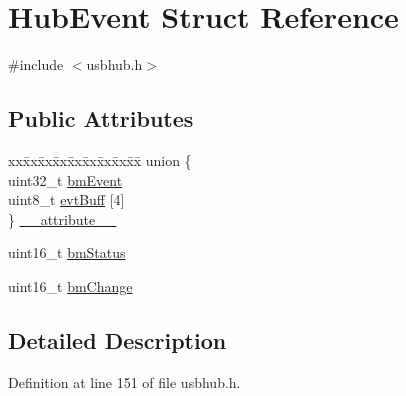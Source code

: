 \hypertarget{struct_hub_event}{\section{\-Hub\-Event \-Struct \-Reference}
\label{struct_hub_event}
}


{\ttfamily \#include $<$usbhub.\-h$>$}

\subsection*{\-Public \-Attributes}
\begin{DoxyCompactItemize}
\item 
\begin{tabbing}
xx\=xx\=xx\=xx\=xx\=xx\=xx\=xx\=xx\=\kill
union \{\\
\>uint32\_t \hyperlink{struct_hub_event_aa7eab68768439ce3a208b3fa4c671a3c}{bmEvent}\\
\>uint8\_t \hyperlink{struct_hub_event_a5a8016b368bc8ac993abae3f97b8306f}{evtBuff} \mbox{[}4\mbox{]}\\
\} \hyperlink{struct_hub_event_aa4dfbb7bfef618b3e43214e18790c017}{\_\_attribute\_\_}\\

\end{tabbing}\item 
uint16\-\_\-t \hyperlink{struct_hub_event_a40dc52f2eb375e6f7ace509a985525ac}{bm\-Status}
\item 
uint16\-\_\-t \hyperlink{struct_hub_event_a9a5761abdc6e8ffc814ba8d3b5b9cd7f}{bm\-Change}
\end{DoxyCompactItemize}


\subsection{\-Detailed \-Description}


\-Definition at line 151 of file usbhub.\-h.



